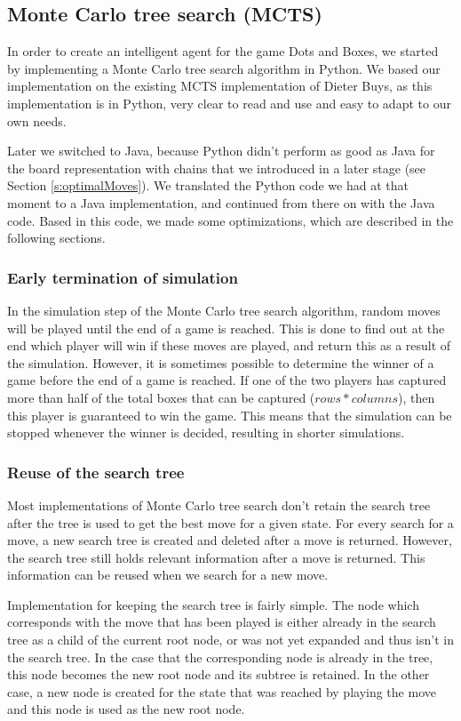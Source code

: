 \subsection{Monte Carlo tree search (MCTS)}
	In order to create an intelligent agent for the game Dots and Boxes, we started by implementing a Monte Carlo tree search algorithm in Python. We based our implementation on the existing MCTS implementation of Dieter Buys\cite{DieterBuys:MCTS}, as this implementation is in Python, very clear to read and use and easy to adapt to our own needs.
	
	Later we switched to Java, because Python didn't perform as good as Java for the board representation with chains that we introduced in a later stage (see Section \ref{s:optimalMoves}). We translated the Python code we had at that moment to a Java implementation, and continued from there on with the Java code. Based in this code, we made some optimizations, which are described in the following sections.
	
	\subsubsection{Early termination of simulation}
	In the simulation step of the Monte Carlo tree search algorithm, random moves will be played until the end of a game is reached. This is done to find out at the end which player will win if these moves are played, and return this as a result of the simulation. However, it is sometimes possible to determine the winner of a game before the end of a game is reached. If one of the two players has captured more than half of the total boxes that can be captured ($rows * columns$), then this player is guaranteed to win the game. This means that the simulation can be stopped whenever the winner is decided, resulting in shorter simulations.
	
	\subsubsection{Reuse of the search tree}
	Most implementations of Monte Carlo tree search don't retain the search tree after the tree is used to get the best move for a given state. For every search for a move, a new search tree is created and deleted after a move is returned.
	However, the search tree still holds relevant information after a move is returned. This information can be reused when we search for a new move. 
	
	Implementation for keeping the search tree is fairly simple. The node which corresponds with the move that has been played is either already in the search tree as a child of the current root node, or was not yet expanded and thus isn't in the search tree. In the case that the corresponding node is already in the tree, this node becomes the new root node and its subtree is retained. In the other case, a new node is created for the state that was reached by playing the move and this node is used as the new root node.
	

